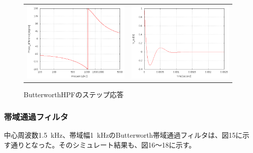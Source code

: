 \documentclass[10pt,a4j,dvipdfmx]{jsarticle}
\begin{document}
   \begin{figure}[H]
       \begin{tabular}{cc}
         \begin{minipage}[t]{0.45\hsize}
           \centering
           \includegraphics[width=8cm]{BHPF_Agraf.png}
           \caption{ButterworthHPFの位相特性}
         \end{minipage} &
         \begin{minipage}[t]{0.45\hsize}
           \centering
           \includegraphics[width = 8cm]{BHPFstep.png}
           \caption{ButterworthHPFのステップ応答}
         \end{minipage}
       \end{tabular}
     \end{figure}

 \subsubsection{帯域通過フィルタ}
 中心周波数\SI{1.5}{\kilo\hertz}、帯域幅\SI{1}{\kilo\hertz}のButterworth帯域通過フィルタは、図15に示す通りとなった。そのシミュレート結果も、図16〜18に示す。
 
\end{document}
